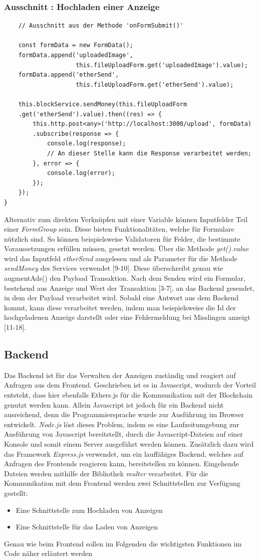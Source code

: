 \subsubsection{Ausschnitt : Hochladen einer Anzeige}
\begin{lstlisting}
	// Ausschnitt aus der Methode 'onFormSubmit()'
	
	const formData = new FormData();
	formData.append('uploadedImage', 
					this.fileUploadForm.get('uploadedImage').value);
	formData.append('etherSend', 
					this.fileUploadForm.get('etherSend').value);
	
	this.blockService.sendMoney(this.fileUploadForm
	.get('etherSend').value).then((res) => {
		this.http.post<any>('http://localhost:3000/upload', formData)
		.subscribe(response => {
			console.log(response);
			// An dieser Stelle kann die Response verarbeitet werden;
		}, error => {
			console.log(error);
		});
	});
}
\end{lstlisting}
Alternativ zum direkten Verknüpfen mit einer Variable können Inputfelder Teil einer \emph{FormGroup} sein. Diese bieten Funktionalitäten, welche für Formulare nützlich sind. 
So können beispielsweise Validatoren für Felder, die bestimmte Voraussetzungen erfüllen müssen, gesetzt werden.
Über die Methode \emph{get().value} wird das Inputfeld \emph{etherSend} ausgelesen und als Parameter für die Methode \emph{sendMoney} des Services verwendet [9-10]. Diese überschreibt genau wie augmentAds() den Payload Transaktion. Nach dem Senden wird ein Formular, bestehend aus Anzeige und Wert der Transaktion [3-7], an das Backend gesendet, in dem der Payload verarbeitet wird. Sobald eine Antwort aus dem Backend kommt, kann diese verarbeitet werden, indem man beispielsweise die Id der hochgeladenen Anzeige darstellt oder eine Fehlermeldung bei Misslingen anzeigt [11-18].
\subsection{Backend}
Das Backend ist für das Verwalten der Anzeigen zuständig und reagiert auf Anfragen aus dem Frontend. Geschrieben ist es in Javascript, wodurch der Vorteil entsteht, dass hier ebenfalls Ethers.js für die Kommunikation mit der Blockchain genutzt werden kann. 
Allein Javascript ist jedoch für ein Backend nicht ausreichend, denn die Programmiersprache wurde zur Ausführung im Browser entwickelt. \emph{Node.js} löst dieses Problem, indem es eine Laufzeitumgebung zur Ausführung von Javascript bereitstellt, durch die Javascript-Dateien auf einer Konsole und somit einem Server ausgeführt werden können. Zusätzlich dazu wird das Framework \emph{Express.js} verwendet, um ein lauffähiges Backend, welches auf Anfragen des Frontends reagieren kann, bereitstellen zu können. Eingehende Dateien werden mithilfe der Bibliothek \emph{multer} verarbeitet.
Für die Kommunikation mit dem Frontend werden zwei Schnittstellen zur Verfügung gestellt: 
\begin{itemize}
	\item Eine Schnittstelle zum Hochladen von Anzeigen
	\item Eine Schnittstelle für das Laden von Anzeigen
\end{itemize}
Genau wie beim Frontend sollen im Folgenden die wichtigsten Funktionen im Code näher erläutert werden
